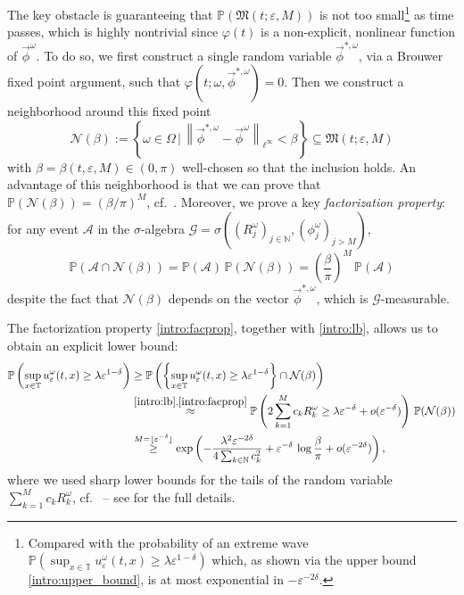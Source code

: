 \documentclass[a4paper,10pt,reqno]{article}
\theoremstyle{definition}
\theoremstyle{plain}
\theoremstyle{plain}
\theoremstyle{definition}
\theoremstyle{plain}
\theoremstyle{plain}
\theoremstyle{plain}
\theoremstyle{definition}
\theoremstyle{definition}
\newcommand{\norm}[1]{\left\lVert #1 \right\rVert}
\def \N{\mathbb N}
\def \P{{\mathbb P}}
\def \T{\mathbb{T}}
\begin{document}
The key obstacle is guaranteeing that $\P(\mathfrak{M}(t;\varepsilon, M))$ is not too small\footnote{Compared with the probability of an extreme wave $\P ( \sup_{x\in\T} u^{\omega}_{\varepsilon}(t,x) \geq \lambda \varepsilon^{1-\delta})$ which, as shown via the upper bound \eqref{intro:upper_bound}, is at most exponential in $-\varepsilon^{-2\delta}$.} as time passes, which is highly nontrivial since $\varphi(t)$ is a non-explicit, nonlinear function of $\vec{\phi}^{\omega}$. 
To do so, we first construct a single random variable $\vec{\phi}^{*,\omega}$, via a Brouwer fixed point argument, such that $\varphi (t;\omega, \vec{\phi}^{*,\omega})=0$. Then we construct a neighborhood around this fixed point 
\begin{equation}\label{intro:nhood}
    \mathcal{N}(\beta):= \left \{ \omega\in\mathbb{\Omega} \, \Big | \, \norm{\vec{\phi}^{*,\omega} - \vec{\phi}^{\omega}}_{\ell^{\infty}} < \beta \right \} \subseteq \mathfrak{M}(t; \varepsilon , M)
\end{equation}
with $\beta=\beta(t,\varepsilon,M)\in (0,\pi)$ well-chosen so that the inclusion holds. An advantage of this neighborhood is that we can prove that $\P(\mathcal{N}(\beta))= (\beta/\pi)^{M}$, cf.~. Moreover, we prove a key \emph{factorization property}: for any event $\mathcal{A}$ in the $\sigma$-algebra $\mathcal{G}=\sigma((R_j^{\omega})_{j \in \N}, (\phi_j^{\omega})_{j>M})$,
\begin{equation}\label{intro:facprop}
    \P( \mathcal{A}\cap \mathcal{N}(\beta)) = \P( \mathcal{A}) \, \P(\mathcal{N}(\beta)) = \left(\frac{\beta}{\pi}\right)^{M}\, \P( \mathcal{A}) 
\end{equation}
despite the fact that $\mathcal{N}(\beta)$ depends on the vector $\vec{\phi}^{*,\omega}$, which is $\mathcal{G}$-measurable.

\medskip

The factorization property \eqref{intro:facprop}, together with \eqref{intro:lb}, allows us to obtain an explicit lower bound:
\begin{align}
        \P \left ( \sup_{x\in\T} u^{\omega}_{\varepsilon}(t,x) \geq \lambda \varepsilon^{1-\delta} \right ) & \geq \P\left( \left\{\sup_{x\in\T} u^{\omega}_{\varepsilon}(t,x) \geq \lambda \varepsilon^{1-\delta}\right\}\cap \mathcal{N}(\beta)\right) \nonumber \\
        & \stackrel{\eqref{intro:lb},\eqref{intro:facprop}}{\approx} \P\left( 2\sum_{k=1}^{M} c_k R_k^{\omega} \geq \lambda \varepsilon^{-\delta} + o(\varepsilon^{-\delta})\right) \, \P (\mathcal{N}(\beta))\nonumber\\
        & \stackrel{M=\lfloor \varepsilon^{-\delta} \rfloor}{\geq} \exp\left( -\frac{\lambda^2\varepsilon^{-2\delta}}{4\sum_{k\in\N} c_k^2} + \varepsilon^{-\delta}\,\log\frac{\beta}{\pi} + o(\varepsilon^{-2\delta})\right),\label{intro:endgame}
\end{align}
where we used sharp lower bounds for the tails of the random variable $\sum_{k=1}^{M} c_k R_k^{\omega}$, cf.~ -- see  for the full details.
\end{document}
